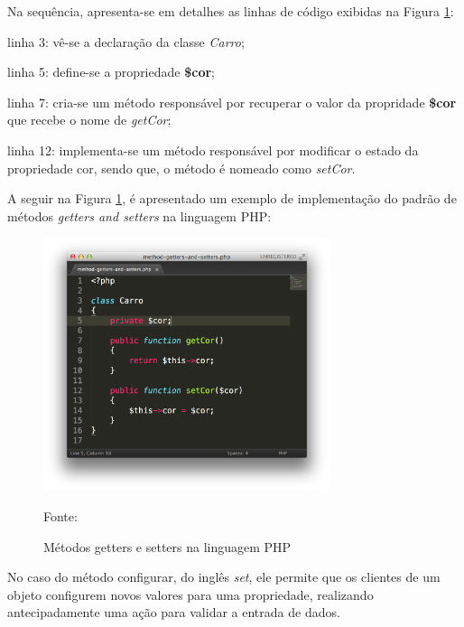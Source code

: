 Na sequência, apresenta-se em detalhes as linhas de código exibidas na Figura
\ref{fig:methodGettersAndSetters}:

\begin{alineas}
    \item linha 3: vê-se a declaração da classe \textit{Carro};
    \item linha 5: define-se a propriedade \textbf{\$cor};
    \item linha 7: cria-se um método responsável por recuperar o valor da
    propridade \textbf{\$cor} que recebe o nome de \textit{getCor};
    \item linha 12: implementa-se um método responsável por modificar o estado
    da propriedade cor, sendo que, o método é nomeado como \textit{setCor}.
\end{alineas}

A seguir na Figura \ref{fig:methodGettersAndSetters}, é apresentado um exemplo
de implementação do padrão de métodos \textit{getters and setters} na
linguagem \acs{PHP}:

\begin{figure}[h!tb]
	\caption{Métodos getters e setters na linguagem PHP}
	\label{fig:methodGettersAndSetters}

	\centering
	\includegraphics[width=0.75\textwidth]{images/method-getters-and-setters.png}

	\centering
	\footnotesize Fonte: \fonteOAutor
\end{figure}

\FloatBarrier 	%

No caso do método configurar, do inglês \textit{set}, ele permite que os
clientes de um objeto configurem novos valores para uma propriedade, realizando
antecipadamente uma ação para validar a entrada de dados.

